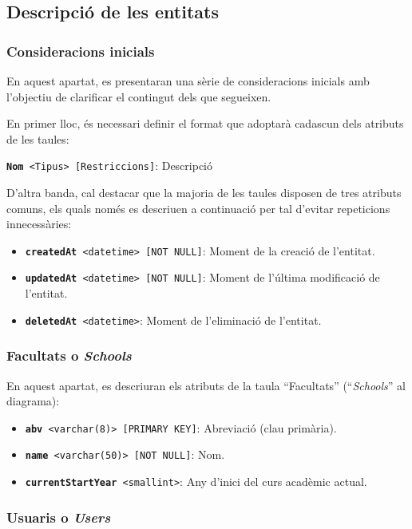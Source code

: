 \documentclass[a4paper,12pt]{ThesisStyle}
\begin{document}
\subsection{Descripció de les entitats}
\label{subsec:bd_entitats}

\subsubsection{Consideracions inicials}

En aquest apartat, es presentaran una sèrie de consideracions inicials amb l'objectiu de clarificar el contingut dels que segueixen.

En primer lloc, és necessari definir el format que adoptarà cadascun dels atributs de les taules:
\\[8pt]
\centerline{\texttt{\textbf{Nom} <Tipus> [Restriccions]}: Descripció}

D'altra banda, cal destacar que la majoria de les taules disposen de tres atributs comuns, els quals només es descriuen a continuació per tal d'evitar repeticions innecessàries:
\begin{itemize}
  \item \texttt{\textbf{createdAt} <datetime> [NOT NULL]}: Moment de la creació de l'entitat.
  \item \texttt{\textbf{updatedAt} <datetime> [NOT NULL]}: Moment de l'última modificació de l'entitat.
  \item \texttt{\textbf{deletedAt} <datetime>}: Moment de l'eliminació de l'entitat.
\end{itemize}

\subsubsection{Facultats o \textit{Schools}}

En aquest apartat, es descriuran els atributs de la taula ``Facultats'' (``\textit{Schools}'' al diagrama):
\begin{itemize}
  \item \texttt{\textbf{abv} <varchar(8)> [PRIMARY KEY]}: Abreviació (clau primària).
  \item \texttt{\textbf{name} <varchar(50)> [NOT NULL]}: Nom.
  \item \texttt{\textbf{currentStartYear} <smallint>}: Any d'inici del curs acadèmic actual.
\end{itemize}

\subsubsection{Usuaris o \textit{Users}}
\end{document}
